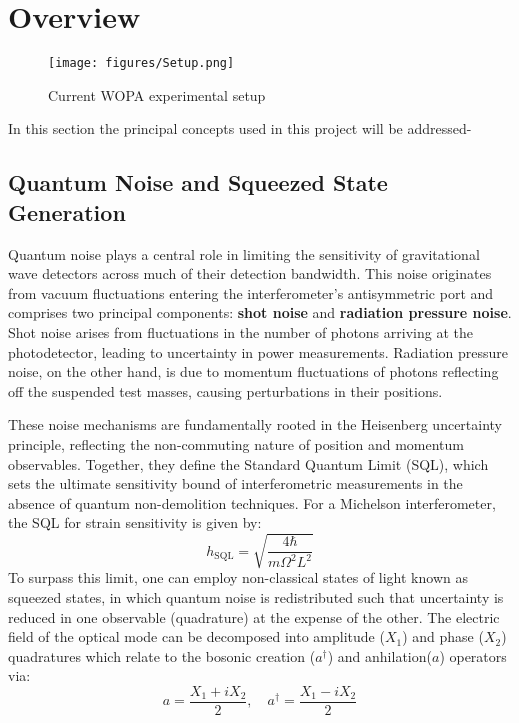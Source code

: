 \documentclass[colorlinks=true,pdfstartview=FitV,linkcolor=blue,
citecolor=red,urlcolor=magenta]{ligodoc}
\begin{document}
\section{Overview}
\begin{figure}[H]
    \centering
    \texttt{[image: figures/Setup.png]}
   \caption{ Current WOPA experimental setup }
    \label{fig:enter-label}
\end{figure}

In this section the principal concepts used in this project will be addressed-
\subsection{Quantum Noise and Squeezed State Generation}
Quantum noise plays a central role in limiting the sensitivity of gravitational wave detectors across much of their detection bandwidth\cite{mckenzie}. This noise originates from vacuum fluctuations entering the interferometer’s antisymmetric port and comprises two principal components: \textbf{shot noise} and \textbf{radiation pressure noise}. Shot noise arises from fluctuations in the number of photons arriving at the photodetector, leading to uncertainty in power measurements. Radiation pressure noise, on the other hand, is due to momentum fluctuations of photons reflecting off the suspended test masses, causing perturbations in their positions\cite{mckenzie}.

These noise mechanisms are fundamentally rooted in the Heisenberg uncertainty principle, reflecting the non-commuting nature of position and momentum observables. Together, they define the Standard Quantum Limit (SQL), which sets the ultimate sensitivity bound of interferometric measurements in the absence of quantum non-demolition techniques. For a Michelson interferometer, the SQL for strain sensitivity is given by:
\begin{equation}
    h_{\mathrm{SQL}} = \sqrt{\frac{4\hbar}{m \Omega^2 L^2}}
\end{equation}
To surpass this limit, one can employ non-classical states of light known as squeezed states, in which quantum noise is redistributed such that uncertainty is reduced in one observable (quadrature) at the expense of the other. The electric field of the optical mode can be decomposed into amplitude ($X_1$) and phase ($X_2$) quadratures which relate to the bosonic creation ($a^\dagger$) and anhilation($a$) operators via:
\begin{equation}
    a = \frac{X_1 + i X_2}{2}, \quad a^\dagger = \frac{X_1 - i X_2}{2}
\end{equation}
\end{document}
